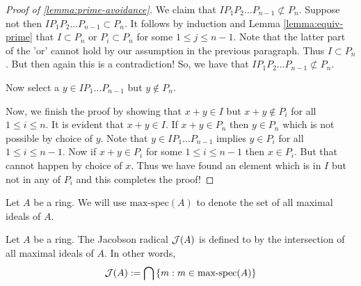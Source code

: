 \begin{proof}[Proof of \ref{lemma:prime-avoidance}]
    We claim that $IP_1 P_2 \ldots P_{n-1} \not\subset P_n$. Suppose not then $I P_1 P_2 \ldots P_{n-1} \subset P_n$. It follows by induction and Lemma \ref{lemma:equiv-prime} that $I \subset P_n$ or $P_i \subset P_n$ for some $1\le j \le n-1$. Note that the latter part of the 'or' cannot hold by our assumption in the previous paragraph. Thus $I \subset P_n$. But then again this is a contradiction! So, we have that $IP_1 P_2 \ldots P_{n-1} \not\subset P_n$.

    Now select a $y\in IP_1 \ldots P_{n-1}$ but $y\not \in P_n$.

    Now, we finish the proof by showing that $x+y \in I$ but $x+y \not \in P_i$ for all $1\le i \le n$. It is evident that $x+y \in I$. If $x+y\in P_n$ then $y\in P_n$ which is not possible by choice of $y$. Note that $y\in IP_1\ldots P_{n-1}$ implies $y\in P_i$ for all $1\le i\le n-1$. Now if $x+y \in P_i$ for some $1\le i \le n-1$ then $x \in P_i$. But that cannot happen by choice of $x$. Thus we have found an element which is in $I$ but not in any of $P_i$ and this completes the proof!

\end{proof}

\begin{notation}
    Let $A$ be a ring. We will use $\text{max-spec} (A)$ to denote the set of all maximal ideals of $A$.
\end{notation}


\begin{definition}
    Let $A$ be a ring. The Jacobson radical ${\cal J} (A)$ is defined to by the intersection of all maximal ideals of $A$. In other words,
    \begin{equation*}
	{\cal J} (A) := \bigcap \left\{ m : m \in \text{max-spec} (A) \right\}
    \end{equation*}
    \label{def:Jacobson}
\end{definition}

